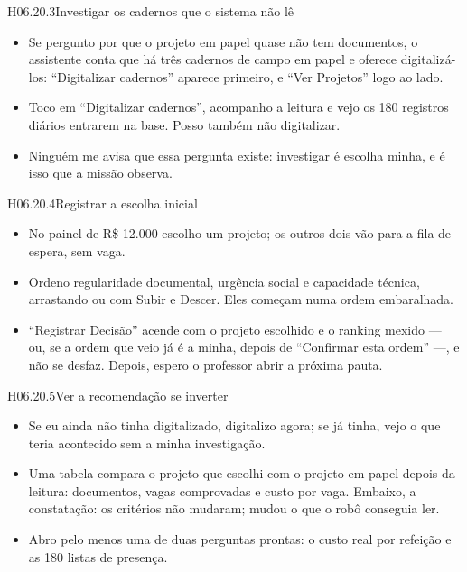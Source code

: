 \begin{historia}{H06.20.3}{Investigar os cadernos que o sistema não lê}{\pronto}
\aceite
\begin{itemize}
  \item Se pergunto por que o projeto em papel quase não tem documentos, o
    assistente conta que há três cadernos de campo em papel e oferece
    digitalizá-los: \enquote{Digitalizar cadernos} aparece primeiro, e
    \enquote{Ver Projetos} logo ao lado.
  \item Toco em \enquote{Digitalizar cadernos}, acompanho a leitura e vejo
    os 180 registros diários entrarem na base. Posso também não digitalizar.
  \item Ninguém me avisa que essa pergunta existe: investigar é escolha
    minha, e é isso que a missão observa.
\end{itemize}
\end{historia}

\begin{historia}{H06.20.4}{Registrar a escolha inicial}{\pronto}
\aceite
\begin{itemize}
  \item No painel de R\$ 12.000 escolho um projeto; os outros dois vão para a
    fila de espera, sem vaga.
  \item Ordeno regularidade documental, urgência social e capacidade técnica,
    arrastando ou com Subir e Descer. Eles começam numa ordem embaralhada.
  \item \enquote{Registrar Decisão} acende com o projeto escolhido e o
    ranking mexido --- ou, se a ordem que veio já é a minha, depois de
    \enquote{Confirmar esta ordem} ---, e não se desfaz. Depois, espero o professor abrir a
    próxima pauta.
\end{itemize}
\end{historia}

\begin{historia}{H06.20.5}{Ver a recomendação se inverter}{\pronto}
\aceite
\begin{itemize}
  \item Se eu ainda não tinha digitalizado, digitalizo agora; se já tinha,
    vejo o que teria acontecido sem a minha investigação.
  \item Uma tabela compara o projeto que escolhi com o projeto em papel depois
    da leitura: documentos, vagas comprovadas e custo por vaga. Embaixo, a
    constatação: os critérios não mudaram; mudou o que o robô conseguia ler.
  \item Abro pelo menos uma de duas perguntas prontas: o custo real por
    refeição e as 180 listas de presença.
\end{itemize}
\end{historia}

